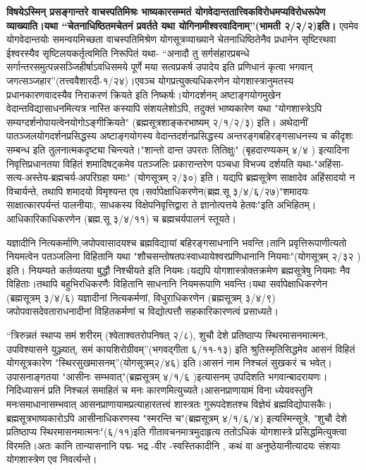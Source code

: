 {\textbf{विषयेऽस्मिन् प्रसङ्गान्तरे वाचस्पतिमिश्रः भाष्यकारसम्मतं योगवेदान्ततात्त्विकविरोधमप्यविरोधरूपेण व्याख्याति।यथा “चेतनाधिष्ठितमचेतनं प्रवर्तते यथा योगिनामीश्वरवादिनाम्”(भामती २/२/२)इति।} एवमेव योगवेदान्तयोः समन्वयमिच्छता वाचस्पतिमिश्रेण योगसूत्रव्याख्याने चेतनाधिष्ठितेनैव प्रधानेन सृष्टिरथवा ईश्वरस्यैव सृष्टिलयकर्तृत्वमिति निरूपितं यथा- “अनादौ तु सर्गसंहारप्रबन्धे सर्गान्तरसमुत्पन्नसञ्जिहीर्षाऽवधिसमये पूर्णे मया सत्वप्रकर्ष उपादेय इति प्रणिधानं कृत्वा भगवान् जगत्सञ्जहार”(तत्त्ववैशारदी-१/२४)।एवञ्च योगप्रत्युक्त्यधिकरणेन योगशास्त्रानुमतस्य प्रधानकारणवादस्यैव निराकरणं क्रियते इति निष्कर्षः।योगदर्शनम् अष्टाङ्गयोगमुखेन वेदान्तविद्यासाधनमित्यत्र नास्ति कस्यापि संशयलेशोऽपि, तदुक्तं भाष्यकारेण यथा "योगशास्त्रेऽपि सम्यग्दर्शनोपायत्वेनयोगोऽङ्गीक्रियते" (ब्रह्मसूत्रशाङ्करभाष्यम् २/१/२/३) इति। अथेदानीं पातञ्जलयोगदर्शनप्रसिद्धस्य अष्टाङ्गयोगस्य वेदान्तदर्शनप्रसिद्धस्य अन्तरङ्गबहिरङ्गसाधनस्य च कीदृशः सम्बन्ध इति तुलनात्मकदृष्ट्या चिन्त्यते।"शान्तो दान्त उपरतः तितिक्षुः" (बृहदारण्यकम् ४/४ ) इत्यादिना निवृत्तिप्रधानतया विहितं शमादिषट्कमेव पतञ्जलिः प्रकारान्तरेण पञ्चधा विभज्य दर्शयति यथा-"अहिंसा-सत्य-अस्तेय-ब्रह्मचर्य-अपरिग्रहा यमाः" (योगसूत्रम् २/३०) इति। यद्यपि ब्रह्मसूत्रेण साक्षादेव अहिंसादयो न विचार्यन्ते, तथापि शमादयो विमृश्यन्त एव।सर्वापेक्षाधिकरणेन(ब्रह्म.सू ३/४/६/२७)"शमादयः साक्षात्कारपर्यन्तं पालनीयाः, साधकस्य विक्षेपनिवृत्तिद्वारा ते ज्ञानोत्पत्तये हेतवः"इति अभिहितम्।आधिकारिकाधिकरणेन (ब्रह्म.सू ३/४/११) च ब्रह्मचर्यपालनं स्तूयते।

यज्ञादीनि नित्यकर्माणि,जपोपवासादयश्च ब्रह्मविद्यायां बहिरङ्गसाधनानि भवन्ति।तानि प्रवृत्तिरूपाणीत्यतो नियमत्वेन पतञ्जलिना विहितानि यथा "शौचसन्तोषतपःस्वाध्यायेश्वरप्रणिधानानि नियमाः"(योगसूत्रम् २/३२ ) इति। नियम्यते कर्तव्यतया बुद्धौ निश्चीयते इति नियमः।यद्यपि योगशास्त्रोक्तक्रमेण ब्रह्मसूत्रेषु नियमाः नैव विहिताः।तथापि बहुभिरधिकरणैः विहितानि साधनानि नियमरूपाणि भवन्ति।यथा सर्वापेक्षाधिकरणेन (ब्रह्मसूत्रम् ३/४/६) यज्ञादीनां नित्यकर्मणां, विधुराधिकरणेन (ब्रह्मसूत्रम् ३/४/९) जपोपवासदेवताराधनादीनां विहितकर्मणां च विद्योत्पत्तौ सहकारिकारणत्वं प्रसाध्यते।

“त्रिरुन्नतं स्थाप्य समं शरीरम् (श्वेताश्वतरोपनिषत् २/८), शुचौ देशे प्रतिष्ठाप्य स्थिरमासनमात्मनः, उपविश्यासने युञ्ज्यात्, समं कायशिरोग्रीवम्”(भगवद्गीता ६/११-१३) इति श्रुतिस्मृतिसिद्धमेव आसनं विहितं योगसूत्रकारेण "स्थिरसुखमासनम्”(योगसूत्रम्२/४६) इति।आसनं नाम निश्चलं सुखकरं च भवेत्।उपासनाङ्गतया "आसीनः सम्भवात्"(ब्रह्मसूत्रम् ४/१/६ )इत्यासनम् उपदिशति भगवान्बादरायणः।निदिध्यासनं प्रति निश्चलं समाहितं च मनः कारणमित्युच्यते।आसनप्राणायामं विना ध्येयवस्तुनि मनःसमाधानासम्भवात् आसनप्राणायामप्रत्याहारतत्त्वं शास्त्रतः गुरूपदेशतश्च विज्ञेयं ब्रह्मविद्योपासकैः। ब्रह्मसूत्रभाष्यकारोऽपि आसीनाधिकरणस्य "स्मरन्ति च"(ब्रह्मसूत्रम् ४/१/६/४) इत्यस्मिन्सूत्रे, "शुचौ देशे प्रतिष्ठाप्य स्थिरमासनमात्मनः"(६/११)इति गीतावचनमात्रमुदाहृत्य ततोऽधिकं योगशास्त्रे प्रसिद्धमित्युक्त्वा विरमति।अतः कानि तान्यासनानि पद्म- भद्र -वीर -स्वस्तिकादीनि , कथं वा अनुष्ठेयानीत्यादयः संशयाः योगशास्त्रेण एव निवर्त्यन्ते।

}
